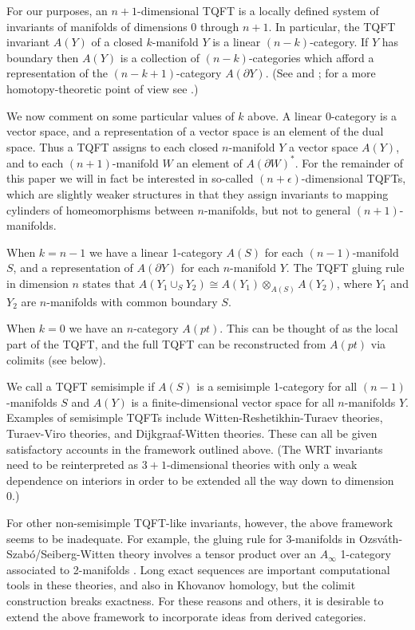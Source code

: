 \documentclass{pnastwo}
\def\bd{\partial}
\def\ot{\otimes}
\begin{document}
\begin{article}
For our purposes, an $n{+}1$-dimensional TQFT is a locally defined system of
invariants of manifolds of dimensions 0 through $n{+}1$. In particular,
the TQFT invariant $A(Y)$ of a closed $k$-manifold $Y$ is a linear $(n{-}k)$-category.
If $Y$ has boundary then $A(Y)$ is a collection of $(n{-}k)$-categories which afford
a representation of the $(n{-}k{+}1)$-category $A(\bd Y)$.
(See \cite{1009.5025} and \cite{kw:tqft};
for a more homotopy-theoretic point of view see \cite{0905.0465}.)

We now comment on some particular values of $k$ above.
A linear 0-category is a vector space, and a representation
of a vector space is an element of the dual space.
Thus a TQFT assigns to each closed $n$-manifold $Y$ a vector space $A(Y)$,
and to each $(n{+}1)$-manifold $W$ an element of $A(\bd W)^*$.
For the remainder of this paper we will in fact be interested in so-called $(n{+}\epsilon)$-dimensional
TQFTs, which are slightly weaker structures in that they assign 
invariants to mapping cylinders of homeomorphisms between $n$-manifolds, but not to general $(n{+}1)$-manifolds.

When $k=n{-}1$ we have a linear 1-category $A(S)$ for each $(n{-}1)$-manifold $S$,
and a representation of $A(\bd Y)$ for each $n$-manifold $Y$.
The TQFT gluing rule in dimension $n$ states that
$A(Y_1\cup_S Y_2) \cong A(Y_1) \ot_{A(S)} A(Y_2)$,
where $Y_1$ and $Y_2$ are $n$-manifolds with common boundary $S$.

When $k=0$ we have an $n$-category $A(pt)$.
This can be thought of as the local part of the TQFT, and the full TQFT can be reconstructed from $A(pt)$
via colimits (see below).

We call a TQFT semisimple if $A(S)$ is a semisimple 1-category for all $(n{-}1)$-manifolds $S$
and $A(Y)$ is a finite-dimensional vector space for all $n$-manifolds $Y$.
Examples of semisimple TQFTs include Witten-Reshetikhin-Turaev theories, 
Turaev-Viro theories, and Dijkgraaf-Witten theories.
These can all be given satisfactory accounts in the framework outlined above.
(The WRT invariants need to be reinterpreted as $3{+}1$-dimensional theories with only a weak 
dependence on interiors in order to be
extended all the way down to dimension 0.)

For other non-semisimple TQFT-like invariants, however, the above framework seems to be inadequate.
For example, the gluing rule for 3-manifolds in Ozsv\'ath-Szab\'o/Seiberg-Witten theory
involves a tensor product over an $A_\infty$ 1-category associated to 2-manifolds \cite{1003.0598,1005.1248}.
Long exact sequences are important computational tools in these theories,
and also in Khovanov homology, but the colimit construction breaks exactness.
For these reasons and others, it is desirable to 
extend the above framework to incorporate ideas from derived categories.


\end{article}
\end{document}

